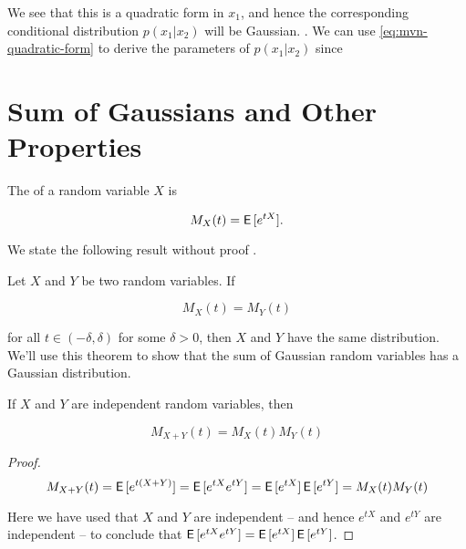
We see that this is a quadratic form in $x_1$, and hence the corresponding conditional distribution $p(x_1 | x_2)$ will be Gaussian. . We can use \eqref{eq:mvn-quadratic-form} to derive the parameters of $p(x_1 | x_2)$ since


\citep{murphy2012machine}

\section{Sum of Gaussians and Other Properties}


\begin{defn}
The  of a random variable $X$ is

\begin{equation}
M_X(t) = \operatorname{\textsf{E}\,}[e^{t X}].
\end{equation}
\end{defn}

We state the following result without proof .

\begin{thm}
Let $X$ and $Y$ be two random variables. If

\begin{equation}
M_X(t) = M_Y(t)
\end{equation}

for all $t \in (-\delta, \delta)$ for some $\delta > 0$, then $X$ and $Y$ have the same distribution. We'll use this theorem to show that the sum of Gaussian random variables has a Gaussian distribution.
\end{thm}

\begin{thm} \citep{mitzenmacher2017probability}\label{thm:sum-independent-gaussian}
If $X$ and $Y$ are independent random variables, then

\begin{equation}
M_{X + Y}(t) = M_X(t) M_Y(t)
\end{equation}
\end{thm}
\begin{proof}
\begin{equation}
M_{X + Y}(t) = \operatorname{\textsf{E}\,}[e^{t(X + Y)}] = \operatorname{\textsf{E}\,}[e^{tX} e^{tY}] = \operatorname{\textsf{E}\,}[e^{tX}] \operatorname{\textsf{E}\,}[e^{tY}] = M_X(t) M_Y(t)
\end{equation}

Here we have used that $X$ and $Y$ are independent -- and hence $e^{tX}$ and $e^{tY}$ are independent -- to conclude that $\operatorname{\textsf{E}\,}[e^{tX} e^{tY}] = \operatorname{\textsf{E}\,}[e^{tX}] \operatorname{\textsf{E}\,}[e^{tY}]$. 
\end{proof}

